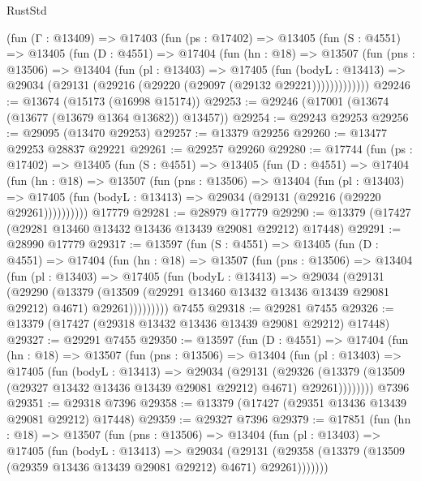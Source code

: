 \begin{lexlean}{RustStd}
\begin{coremodule}
    (fun (Γ : @13409) =>
    @17403
      (fun (ps : @17402) =>
      @13405
        (fun (S : @4551) =>
        @13405
          (fun (D : @4551) =>
          @17404
            (fun (hn : @18) =>
            @13507
              (fun (pns : @13506) =>
              @13404
                (fun (pl : @13403) =>
                @17405
                  (fun (bodyL : @13413) =>
                  @29034 (@29131 (@29216 (@29220 (@29097 (@29132 @29221)))))))))))))
@29246 := @13674 (@15173 (@16998 @15174))
@29253 := @29246 (@17001 (@13674 (@13677 (@13679 @1364 @13682)) @13457))
@29254 := @29243 @29253
@29256 := @29095 (@13470 @29253)
@29257 := @13379 @29256
@29260 := @13477 @29253 @28837 @29221
@29261 := @29257 @29260
@29280 := @17744
    (fun (ps : @17402) =>
    @13405
      (fun (S : @4551) =>
      @13405
        (fun (D : @4551) =>
        @17404
          (fun (hn : @18) =>
          @13507
            (fun (pns : @13506) =>
            @13404
              (fun (pl : @13403) =>
              @17405 (fun (bodyL : @13413) => @29034 (@29131 (@29216 (@29220 @29261))))))))))
    @17779
@29281 := @28979 @17779
@29290 := @13379 (@17427 (@29281 @13460 @13432 @13436 @13439 @29081 @29212) @17448)
@29291 := @28990 @17779
@29317 := @13597
    (fun (S : @4551) =>
    @13405
      (fun (D : @4551) =>
      @17404
        (fun (hn : @18) =>
        @13507
          (fun (pns : @13506) =>
          @13404
            (fun (pl : @13403) =>
            @17405
              (fun (bodyL : @13413) =>
              @29034
                (@29131
                  (@29290
                    (@13379
                      (@13509 (@29291 @13460 @13432 @13436 @13439 @29081 @29212) @4671)
                      @29261)))))))))
    @7455
@29318 := @29281 @7455
@29326 := @13379 (@17427 (@29318 @13432 @13436 @13439 @29081 @29212) @17448)
@29327 := @29291 @7455
@29350 := @13597
    (fun (D : @4551) =>
    @17404
      (fun (hn : @18) =>
      @13507
        (fun (pns : @13506) =>
        @13404
          (fun (pl : @13403) =>
          @17405
            (fun (bodyL : @13413) =>
            @29034
              (@29131
                (@29326
                  (@13379 (@13509 (@29327 @13432 @13436 @13439 @29081 @29212) @4671) @29261))))))))
    @7396
@29351 := @29318 @7396
@29358 := @13379 (@17427 (@29351 @13436 @13439 @29081 @29212) @17448)
@29359 := @29327 @7396
@29379 := @17851
    (fun (hn : @18) =>
    @13507
      (fun (pns : @13506) =>
      @13404
        (fun (pl : @13403) =>
        @17405
          (fun (bodyL : @13413) =>
          @29034
            (@29131
              (@29358 (@13379 (@13509 (@29359 @13436 @13439 @29081 @29212) @4671) @29261)))))))

\end{coremodule}
\end{lexlean}
